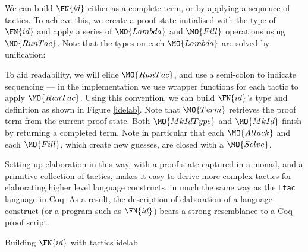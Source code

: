 
We can build $\FN{id}$ either as a complete term, or by applying a sequence of tactics.
To achieve this, we create a proof state initialised with the type of $\FN{id}$ and
apply a series of $\MO{Lambda}$ and $\MO{Fill}$ operations using $\MO{RunTac}$.
Note that the types on each $\MO{Lambda}$ are solved by unification:


To aid readability, we will elide $\MO{RunTac}$, and use a semi-colon to indicate
sequencing --- in the implementation we use wrapper functions for each tactic to
apply $\MO{RunTac}$.
Using this convention, we can build $\FN{id}$'s type and definition as shown
in Figure \ref{idelab}. Note that $\MO{Term}$ retrieves the proof term from the current proof
state. Both $\MO{MkIdType}$ and $\MO{MkId}$ finish by returning a completed \TT{} term.
Note in particular that each $\MO{Attack}$ and each $\MO{Fill}$, which create new guesses,
are closed with a $\MO{Solve}$.

Setting up elaboration in this way, with a proof state captured in a monad,
and a primitive collection of tactics,
makes it easy to derive more complex tactics for elaborating higher level language constructs,
in much the same way as the \texttt{Ltac} language in Coq. As a result, the
description of elaboration of
a language construct (or a program such as $\FN{id}$) bears a strong resemblance to
a Coq proof script.

{Building $\FN{id}$ with tactics}
{idelab}

